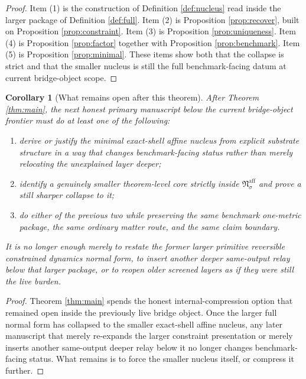 \documentclass[11pt]{article}
\newcommand{\AffineNucleus}[1]{\mathfrak N_{#1}^{\mathrm{aff}}}
\newtheorem{corollary}{Corollary}
\begin{document}
\begin{proof}
Item (1) is the construction of Definition \ref{def:nucleus} read inside the larger package of Definition \ref{def:full}. Item (2) is Proposition \ref{prop:recover}, built on Proposition \ref{prop:constraint}. Item (3) is Proposition \ref{prop:uniqueness}. Item (4) is Proposition \ref{prop:factor} together with Proposition \ref{prop:benchmark}. Item (5) is Proposition \ref{prop:minimal}. These items show both that the collapse is strict and that the smaller nucleus is still the full benchmark-facing datum at current bridge-object scope.
\end{proof}

\begin{corollary}[What remains open after this theorem]
\label{cor:next}
After Theorem \ref{thm:main}, the next honest primary manuscript below the current bridge-object frontier must do at least one of the following:
\begin{enumerate}
    \item derive or justify the minimal exact-shell affine nucleus from explicit substrate structure in a way that changes benchmark-facing status rather than merely relocating the unexplained layer deeper;
    \item identify a genuinely smaller theorem-level core strictly inside \(\AffineNucleus{\sigma}\) and prove a still sharper collapse to it;
    \item do either of the previous two while preserving the same benchmark one-metric package, the same ordinary matter route, and the same claim boundary.
\end{enumerate}
It is no longer enough merely to restate the former larger primitive reversible constrained dynamics normal form, to insert another deeper same-output relay below that larger package, or to reopen older screened layers as if they were still the live burden.
\end{corollary}

\begin{proof}
Theorem \ref{thm:main} spends the honest internal-compression option that remained open inside the previously live bridge object. Once the larger full normal form has collapsed to the smaller exact-shell affine nucleus, any later manuscript that merely re-expands the larger constraint presentation or merely inserts another same-output deeper relay below it no longer changes benchmark-facing status. What remains is to force the smaller nucleus itself, or compress it further.
\end{proof}
\end{document}
